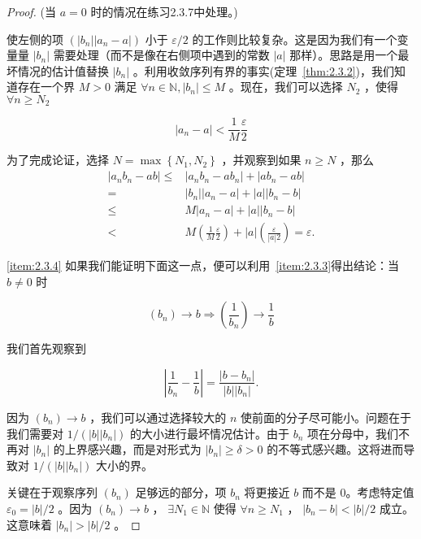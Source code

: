 \begin{proof}
(当 \(a = 0\) 时的情况在练习2.3.7中处理。)

使左侧的项 \(\left( {\left| {b}_{n}\right| \left| {{a}_{n} - a}\right| }\right)\) 小于 \(\varepsilon /2\) 的工作则比较复杂。这是因为我们有一个变量量 \(\left| {b}_{n}\right|\) 需要处理（而不是像在右侧项中遇到的常数 \(\left| a\right|\) 那样）。思路是用一个最坏情况的估计值替换 \(\left| {b}_{n}\right|\) 。利用收敛序列有界的事实(定理~\ref{thm:2.3.2})，我们知道存在一个界 \(M > 0\) 满足 \(\forall n\in \mathbb{N}, \left| {b}_{n}\right|  \leq  M\) 。现在，我们可以选择 \({N}_{2}\) ，使得 $\forall n\ge N_2$

\[
\left| {{a}_{n} - a}\right|  < \frac{1}{M}\frac{\varepsilon }{2}
\]

为了完成论证，选择 \(N = \max \left\{  {{N}_{1},{N}_{2}}\right\}\) ，并观察到如果 \(n \geq  N\) ，那么
\begin{align*}
\left| {{a}_{n}{b}_{n} - {ab}}\right|  \leq & \left| {{a}_{n}{b}_{n} - a{b}_{n}}\right|  + \left| {a{b}_{n} - {ab}}\right|\\
= &\left| {b}_{n}\right| \left| {{a}_{n} - a}\right|  + \left| a\right| \left| {{b}_{n} - b}\right|\\
\leq & M\left| {{a}_{n} - a}\right|  + \left| a\right| \left| {{b}_{n} - b}\right|\\
< & M\left( \frac{1 }{M}\frac{\varepsilon}{2}\right)  + \left| a\right| \left( \frac{\varepsilon }{\left| a\right| 2}\right)  = \varepsilon .
\end{align*}


\ref{item:2.3.4} 如果我们能证明下面这一点，便可以利用~\ref{item:2.3.3}得出结论：当 $b\ne 0$ 时

\[
\left( {b}_{n}\right)  \rightarrow  b \Rightarrow \left( \frac{1}{{b}_{n}}\right)  \rightarrow  \frac{1}{b}
\]

我们首先观察到

\[
\left| {\frac{1}{{b}_{n}} - \frac{1}{b}}\right|  = \frac{\left| b - {b}_{n}\right| }{\left| b\right| \left| {b}_{n}\right| }.
\]

因为 \(\left( {b}_{n}\right)  \rightarrow  b\) ，我们可以通过选择较大的 \(n\) 使前面的分子尽可能小。问题在于我们需要对 \(1/\left( {\left| b\right| \left| {b}_{n}\right| }\right)\) 的大小进行最坏情况估计。由于 \({b}_{n}\) 项在分母中，我们不再对 \(\left| {b}_{n}\right|\) 的上界感兴趣，而是对形式为 \(\left| {b}_{n}\right|  \geq  \delta  > 0\) 的不等式感兴趣。这将进而导致对 \(1/\left( {\left| b\right| \left| {b}_{n}\right| }\right)\) 大小的界。

关键在于观察序列 \(\left( {b}_{n}\right)\) 足够远的部分，项 $b_n$ 将更接近 \(b\) 而不是 0。考虑特定值 \({\varepsilon }_{0} = \left| b\right| /2\) 。因为 \(\left( {b}_{n}\right)  \rightarrow  b\) ， \(\exists {N}_{1}\in \mathbb{N}\) 使得 \(\forall n \geq  {N}_{1}\) ， \(\left| {{b}_{n} - b}\right|  < \left| b\right| /2\) 成立。这意味着 \(\left| {b}_{n}\right|  > \left| b\right| /2\) 。


\end{proof}
